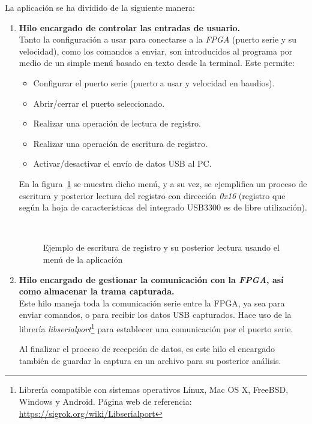 La aplicación se ha dividido de la siguiente manera:
\begin{enumerate}
    \item \textbf{Hilo encargado de controlar las entradas de usuario.} \\
    Tanto la configuración a usar para conectarse a la \emph{FPGA} (puerto serie y su velocidad), como los comandos a enviar, son introducidos al programa por medio de un simple menú basado en texto desde la terminal. Este permite:
    \begin{itemize}
        \item Configurar el puerto serie (puerto a usar y velocidad en baudios).
        \item Abrir/cerrar el puerto seleccionado.
        \item Realizar una operación de lectura de registro.
        \item Realizar una operación de escritura de registro.
        \item Activar/desactivar el envío de datos USB al PC.
    \end{itemize}

    En la figura~\ref{fig:matriz-app-menu} se muestra dicho menú, y a su vez, se ejemplifica un proceso de escritura y posterior lectura del registro con dirección \emph{0x16} (registro que según la hoja de características del integrado USB3300\cite{microchip:usb3300} es de libre utilización).

    \begin{figure}[htbp]
        \centering
         \\
        \caption{Ejemplo de escritura de registro y su posterior lectura usando el menú de la aplicación} 
        \label{fig:matriz-app-menu}
    \end{figure}
    
    \item \textbf{Hilo encargado de gestionar la comunicación con la \emph{FPGA}, así como almacenar la trama capturada.} \\
    Este hilo maneja toda la comunicación serie entre la FPGA, ya sea para enviar comandos, o para recibir los datos USB capturados. Hace uso de la librería \emph{libserialport}\footnote{Librería compatible con sistemas operativos Linux, Mac OS X, FreeBSD, Windows y Android. Página web de referencia: \url{https://sigrok.org/wiki/Libserialport}} para establecer una comunicación por el puerto serie.

    Al finalizar el proceso de recepción de datos, es este hilo el encargado también de guardar la captura en un archivo para su posterior análisis.

\end{enumerate}


